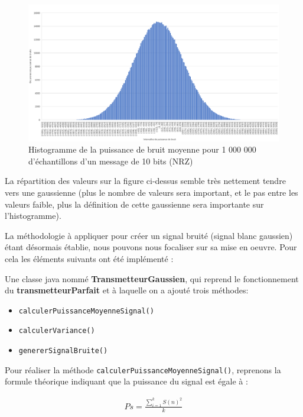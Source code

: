 \begin{figure}[H]
    \centering
    \includegraphics[width=\textwidth]{img/etape3_histo.png}
    \caption{Histogramme de la puissance de bruit moyenne pour 1 000 000 d'échantillons d'un message de 10 bits (NRZ)}
    \label{fig:etape3_histo}
\end{figure}

La répartition des valeurs sur la figure ci-dessus semble très nettement tendre vers une gaussienne (plus le nombre de valeurs sera important, et le pas entre les valeurs faible, plus la définition de cette gaussienne sera importante sur l'histogramme). 

La méthodologie à appliquer pour créer un signal bruité (signal blanc gaussien) étant désormais établie, nous pouvons nous focaliser sur sa mise en oeuvre. Pour cela les éléments suivants ont été implémenté :

Une classe java nommé \textbf{TransmetteurGaussien}, qui reprend le fonctionnement du \textbf{transmetteurParfait} et à laquelle on a ajouté trois méthodes:
     \begin{itemize}
        \item \texttt{calculerPuissanceMoyenneSignal()}
        \item \texttt{calculerVariance()}
        \item \texttt{genererSignalBruite()}
    \end{itemize}

\vspace{20pt}
   
Pour réaliser la méthode \texttt{calculerPuissanceMoyenneSignal()}, reprenons la formule théorique indiquant que la puissance du signal est égale à :

 \begin{align*}
    Ps = \frac{\sum_{i=1}^{k}S(n)^2}{k} 
 \end{align*}

